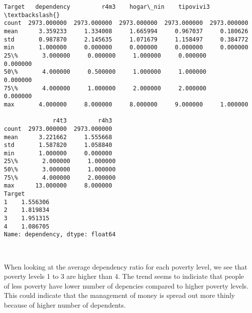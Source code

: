 \documentclass[11pt]{article}
\begin{document}
    \begin{Verbatim}[commandchars=\\\{\}]
            Target   dependency         r4m3    hogar\_nin    tipovivi3  \textbackslash{}
count  2973.000000  2973.000000  2973.000000  2973.000000  2973.000000   
mean      3.359233     1.334008     1.665994     0.967037     0.180626   
std       0.987870     2.145635     1.071679     1.158497     0.384772   
min       1.000000     0.000000     0.000000     0.000000     0.000000   
25\%       3.000000     0.000000     1.000000     0.000000     0.000000   
50\%       4.000000     0.500000     1.000000     1.000000     0.000000   
75\%       4.000000     1.000000     2.000000     2.000000     0.000000   
max       4.000000     8.000000     8.000000     9.000000     1.000000   

              r4t3         r4h3  
count  2973.000000  2973.000000  
mean      3.221662     1.555668  
std       1.587820     1.058840  
min       1.000000     0.000000  
25\%       2.000000     1.000000  
50\%       3.000000     1.000000  
75\%       4.000000     2.000000  
max      13.000000     8.000000  
Target
1    1.556306
2    1.819834
3    1.951315
4    1.086705
Name: dependency, dtype: float64

    \end{Verbatim}

    \begin{center}
    \end{center}
    { \hspace*{\fill} \\}
    
    When looking at the average dependency ratio for each poverty level, we
see that poverty levels 1 to 3 are higher than 4. The trend seems to
indiciate that people of less poverty have lower number of depencies
compared to higher poverty levels. This could indicate that the
management of money is spread out more thinly because of higher number
of dependents.
\end{document}
